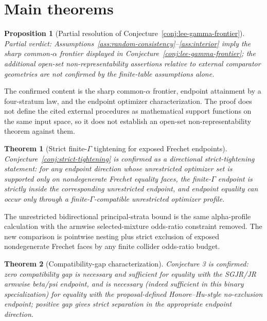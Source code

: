 \documentclass[11pt]{article}
\theoremstyle{definition}
\theoremstyle{plain}
\newtheorem{theorem}{Theorem}
\newtheorem{proposition}{Proposition}
\theoremstyle{remark}
\begin{document}
\section{Main theorems}
\begin{proposition}[Partial resolution of Conjecture~\ref{conj:lee-gamma-frontier}]\label{prop:lee-gamma-frontier-partial}
Partial verdict: Assumptions~\ref{ass:random-consistency}--\ref{ass:interior} imply the sharp common-\(\alpha\) frontier displayed in Conjecture~\ref{conj:lee-gamma-frontier}; the additional open-set non-representability assertions relative to external comparator geometries are not confirmed by the finite-table assumptions alone.
\end{proposition}

The confirmed content is the sharp common-\(\alpha\) frontier, endpoint
attainment by a four-stratum law, and the endpoint optimizer
characterization.  The proof does not define the cited external procedures as
mathematical support functions on the same input space, so it does not
establish an open-set non-representability theorem against them.

\begin{theorem}[Strict finite-\(\Gamma\) tightening for exposed Frechet endpoints]\label{thm:strict-tightening}
Conjecture~\ref{conj:strict-tightening} is confirmed as a directional strict-tightening statement: for any endpoint direction whose unrestricted optimizer set is supported only on nondegenerate Frechet equality faces, the finite-\(\Gamma\) endpoint is strictly inside the corresponding unrestricted endpoint, and endpoint equality can occur only through a finite-\(\Gamma\)-compatible unrestricted optimizer profile.
\end{theorem}

The unrestricted bidirectional principal-strata bound is the same
alpha-profile calculation with the armwise selected-mixture odds-ratio
constraint removed.  The new comparison is pointwise nesting plus strict
exclusion of exposed nondegenerate Frechet faces by any finite collider
odds-ratio budget.

\begin{theorem}[Compatibility-gap characterization]\label{thm:coupling-iff-confirmed}
Conjecture 3 is confirmed: zero compatibility gap is necessary and sufficient for equality with the SGJR/JR armwise beta/psi endpoint, and is necessary (indeed sufficient in this binary specialization) for equality with the proposal-defined Honore--Hu-style no-exclusion endpoint; positive gap gives strict separation in the appropriate endpoint direction.
\end{theorem}
\end{document}
